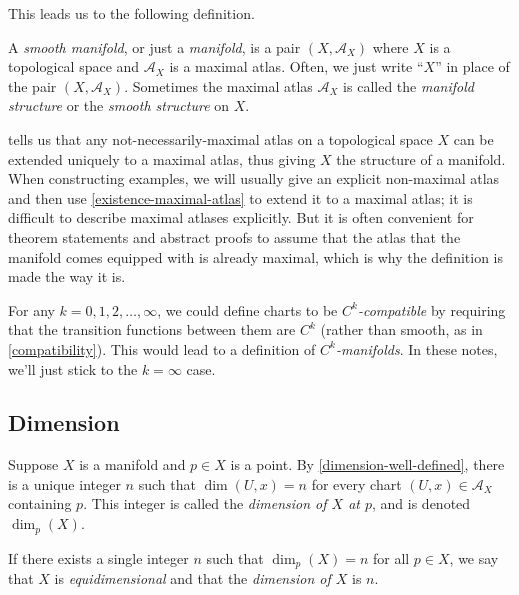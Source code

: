 This leads us to the following definition.

\begin{definition}[Manifold]  
	A \emph{smooth manifold}, or just a \emph{manifold}, is a pair $(X, \mathscr{A}_X)$ where $X$ is a topological space and $\mathscr{A}_X$ is a maximal atlas. Often, we just write ``$X$'' in place of the pair $(X, \mathscr{A}_X)$. Sometimes the maximal atlas $\mathscr{A}_X$ is called the \emph{manifold structure} or the \emph{smooth structure} on $X$.
\end{definition}

 tells us that any not-necessarily-maximal atlas on a topological space $X$ can be extended uniquely to a maximal atlas, thus giving $X$ the structure of a manifold. When constructing examples, we will usually give an explicit non-maximal atlas and then use \cref{existence-maximal-atlas} to extend it to a maximal atlas; it is difficult to describe maximal atlases explicitly. But it is often convenient for theorem statements and abstract proofs to assume that the atlas that the manifold comes equipped with is already maximal, which is why the definition is made the way it is.

\begin{unimportantremark}
	For any $k = 0, 1, 2, \dotsc, \infty$, we could define charts to be \emph{$C^k$-compatible} by requiring that the transition functions between them are $C^k$ (rather than smooth, as in \cref{compatibility}). This would lead to a definition of \emph{$C^k$-manifolds}. In these notes, we'll just stick to the $k = \infty$ case.  
\end{unimportantremark}

\subsection{Dimension}

\begin{definition}[Dimension] 
	Suppose $X$ is a manifold and $p \in X$ is a point. By \cref{dimension-well-defined}, there is a unique integer $n$ such that $\dim(U,x) = n$ for every chart $(U, x) \in \mathscr{A}_X$ containing $p$. This integer is called the \emph{dimension of $X$ at $p$}, and is denoted $\dim_p(X)$. 
	
	If there exists a single integer $n$ such that $\dim_p(X) = n$ for all $p \in X$, we say that $X$ is \emph{equidimensional} and that the \emph{dimension of $X$} is $n$. 
\end{definition}

